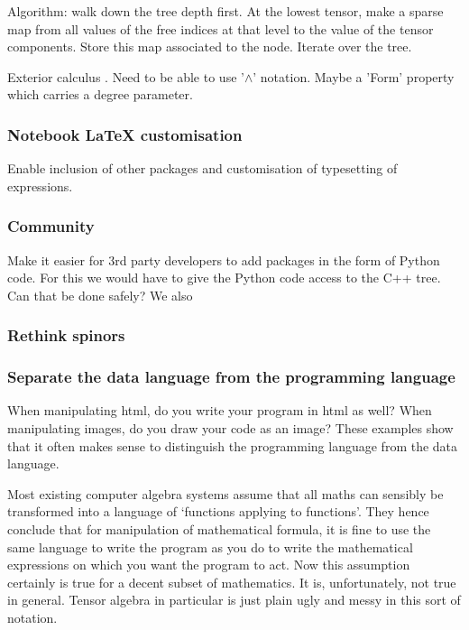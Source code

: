 \documentclass[11pt]{article}
\begin{document}
Algorithm: walk down the tree depth first. At the lowest tensor, make
a sparse map from all values of the free indices at that level to the
value of the tensor components. Store this map associated to the
node. Iterate over the tree.

Exterior calculus \cite{xTerior}. Need to be able to use '$\wedge$'
notation. Maybe a 'Form' property which carries a degree parameter.


\subsubsection{Notebook \LaTeX{} customisation}

Enable inclusion of other packages and customisation of typesetting of expressions.

\subsubsection{Community}

Make it easier for 3rd party developers to add packages in the form of
Python code. For this we would have to give the Python code access to
the C++ tree. Can that be done safely? We also 

\subsubsection{Rethink spinors}

\subsubsection{Separate the data language from the programming language}

When manipulating html, do you write your program in html as well?
When manipulating images, do you draw your code as an image? These
examples show that it often makes sense to distinguish the programming
language from the data language.

Most existing computer algebra systems assume that all maths can
sensibly be transformed into a language of `functions applying to
functions'. They hence conclude that for manipulation of mathematical
formula, it is fine to use the same language to write the program as
you do to write the mathematical expressions on which you want the
program to act. Now this assumption certainly is true for a decent
subset of mathematics. It is, unfortunately, not true in
general. Tensor algebra in particular is just plain ugly and messy in
this sort of notation.
\end{document}
